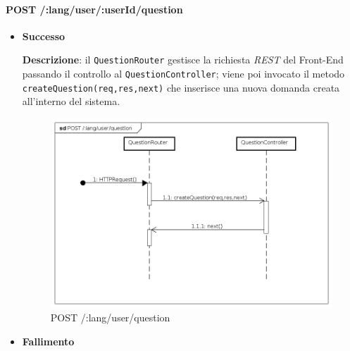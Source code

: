 \paragraph{POST /:lang/user/:userId/question}
\begin{itemize}
\item \textbf{Successo}

\textbf{Descrizione}: il \texttt{QuestionRouter} gestisce la richiesta \textit{REST} del Front-End passando il controllo al \texttt{QuestionController}; viene poi invocato il metodo\\ \texttt{createQuestion(req,res,next)} che inserisce una nuova domanda creata all'interno del sistema.

\begin{figure}[ht]
	\centering
	\includegraphics[scale=0.45]{UML/DiagrammiDiSequenza/Back-end/POST__lang_user_question.png}
	\caption{POST /:lang/user/question}
\end{figure}
\FloatBarrier

\item \textbf{Fallimento}
\end{itemize}
